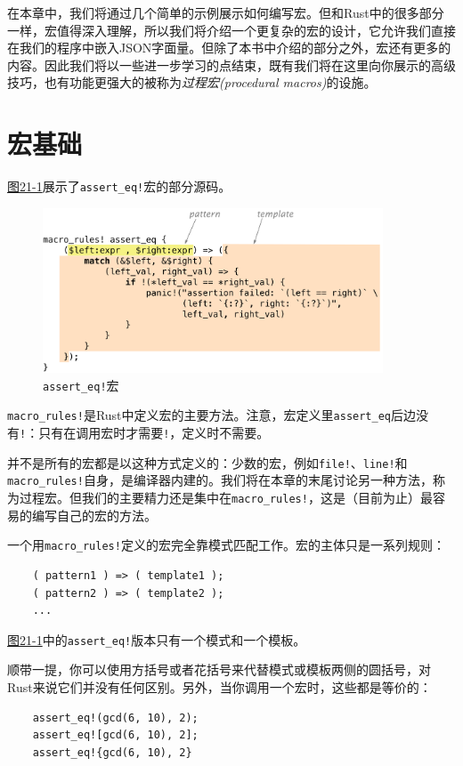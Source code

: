 在本章中，我们将通过几个简单的示例展示如何编写宏。但和Rust中的很多部分一样，宏值得深入理解，所以我们将介绍一个更复杂的宏的设计，它允许我们直接在我们的程序中嵌入JSON字面量。但除了本书中介绍的部分之外，宏还有更多的内容。因此我们将以一些进一步学习的点结束，既有我们将在这里向你展示的高级技巧，也有功能更强大的被称为\emph{过程宏(procedural macros)}的设施。

\section{宏基础}
\hyperref[f21-1]{图21-1}展示了\texttt{assert\_eq!}宏的部分源码。

\begin{figure}[htbp]
    \centering
    \includegraphics[width=0.9\textwidth]{../img/f21-1.png}
    \caption{\texttt{assert\_eq!}宏}
    \label{f21-1}
\end{figure}

\texttt{macro\_rules!}是Rust中定义宏的主要方法。注意，宏定义里\texttt{assert\_eq}后边没有\texttt{!}：只有在调用宏时才需要\texttt{!}，定义时不需要。

并不是所有的宏都是以这种方式定义的：少数的宏，例如\texttt{file!}、\texttt{line!}和\texttt{macro\_rules!}自身，是编译器内建的。我们将在本章的末尾讨论另一种方法，称为过程宏。但我们的主要精力还是集中在\texttt{macro\_rules!}，这是（目前为止）最容易的编写自己的宏的方法。

一个用\texttt{macro\_rules!}定义的宏完全靠模式匹配工作。宏的主体只是一系列规则：
\begin{verbatim}
    ( pattern1 ) => ( template1 );
    ( pattern2 ) => ( template2 );
    ...
\end{verbatim}

\hyperref[f21-1]{图21-1}中的\texttt{assert\_eq!}版本只有一个模式和一个模板。

顺带一提，你可以使用方括号或者花括号来代替模式或模板两侧的圆括号，对Rust来说它们并没有任何区别。另外，当你调用一个宏时，这些都是等价的：
\begin{verbatim}
    assert_eq!(gcd(6, 10), 2);
    assert_eq![gcd(6, 10), 2];
    assert_eq!{gcd(6, 10), 2}
\end{verbatim}

